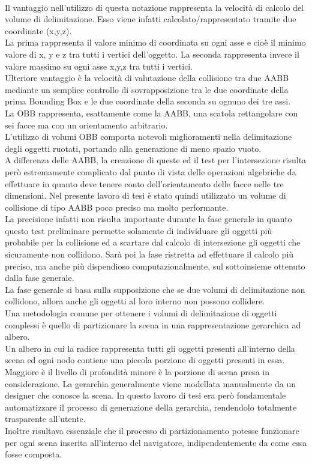 \\
Il vantaggio nell’utilizzo di questa notazione rappresenta la velocità di calcolo del volume di delimitazione. Esso viene infatti calcolato/rappresentato tramite due coordinate (x,y,z).
\\
La prima rappresenta il valore minimo di coordinata su ogni asse e cioè il minimo valore di x, y e z tra tutti i vertici dell’oggetto. La seconda rappresenta invece il valore massimo su ogni asse x,y,z tra tutti i vertici.
\\
Ulteriore vantaggio è la velocità di valutazione della collisione tra due AABB mediante un semplice controllo di sovrapposizione tra le due coordinate della prima Bounding Box e le due coordinate della seconda su ognuno dei tre assi.
\\

La OBB rappresenta, esattamente come la AABB, una scatola rettangolare con sei facce ma con un orientamento arbitrario.
\\
L’utilizzo di volumi OBB comporta notevoli miglioramenti nella delimitazione degli oggetti ruotati, portando alla generazione di meno spazio vuoto.
\\
A differenza delle AABB, la creazione di queste ed il test per l’intersezione risulta però estremamente complicato dal punto di vista delle operazioni algebriche da effettuare in quanto deve tenere conto dell’orientamento delle facce nelle tre dimensioni.
Nel presente lavoro di tesi è stato quindi utilizzato un volume di collisione di tipo AABB poco preciso ma molto performante.
\\
La precisione infatti non risulta importante durante la fase generale in quanto questo test preliminare permette solamente di individuare gli oggetti più probabile per la collisione ed a scartare dal calcolo di intersezione gli oggetti che sicuramente non collidono. Sarà poi la fase ristretta ad effettuare il calcolo più preciso, ma anche più dispendioso computazionalmente, sul sottoinsieme ottenuto dalla fase generale.
\\
La fase generale si basa sulla supposizione che se due volumi di delimitazione non collidono, allora anche gli oggetti al loro interno non possono collidere.
\\
Una metodologia comune per ottenere i volumi di delimitazione di oggetti complessi è quello di partizionare la scena in una rappresentazione gerarchica ad albero.
\\
Un albero in cui la radice rappresenta tutti gli oggetti presenti all’interno della scena ed ogni nodo contiene una piccola porzione di oggetti presenti in essa.
\\
Maggiore è il livello di profondità minore è la porzione di scena presa in considerazione.
La gerarchia generalmente viene modellata manualmente da un designer che conosce la scena. In questo lavoro di tesi era però fondamentale automatizzare il processo di generazione della gerarchia, rendendolo totalmente trasparente all’utente.
\\
Inoltre risultava essenziale che il processo di partizionamento potesse funzionare per ogni scena inserita all’interno del navigatore, indipendentemente da come essa fosse composta.
\\

